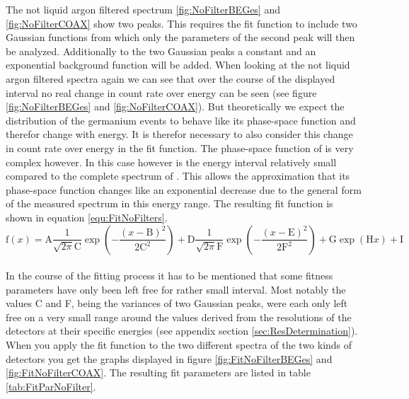\documentclass[encoding=utf8,british]{tumphthesis}
\begin{document}
The not liquid argon filtered spectrum \ref{fig:NoFilterBEGes} and \ref{fig:NoFilterCOAX} show two peaks.
This requires the fit function to include two Gaussian functions from which only the parameters of the second peak will then be analyzed.
Additionally to the two Gaussian peaks a constant and an exponential background function will be added.
When looking at the not liquid argon filtered spectra again we can see that over the course of the displayed interval no real change in count rate over energy can be seen (see figure \ref{fig:NoFilterBEGes} and \ref{fig:NoFilterCOAX}).
But theoretically we expect the distribution of the germanium events to behave like its phase-space function and therefor change with energy.
It is therefor necessary to also consider this change in count rate over energy in the fit function.
The phase-space function of  is very complex however.
In this case however is the energy interval relatively small compared to the complete spectrum of .
This allows the approximation that its phase-space function changes like an exponential decrease due to the general form of the measured spectrum in this energy range.
The resulting fit function is shown in equation \ref{equ:FitNoFilters}.
\\

\begin{equation}
\mathrm{f}(x) = \mathrm{A}\frac{1}{\sqrt{2\pi}\mathrm{C}}\exp\left(-\frac{(x-\mathrm{B})^2}{2\mathrm{C}^2}\right) + \mathrm{D}\frac{1}{\sqrt{2\pi}\mathrm{F}}\exp\left(-\frac{(x-\mathrm{E})^2}{2\mathrm{F}^2}\right) + \mathrm{G}\exp\left(\mathrm{H}x\right) + \mathrm{I}
\label{equ:FitNoFilters}
\end{equation}
\\

In the course of the fitting process it has to be mentioned that some fitness parameters have only been left free for rather small interval.
Most notably the values C and F, being the variances of two Gaussian peaks, were each only left free on a very small range around the values derived from the resolutions of the detectors at their specific energies (see appendix section \ref{sec:ResDetermination}).
When you apply the fit function to the two different spectra of the two kinds of detectors you get the graphs displayed in figure \ref{fig:FitNoFilterBEGes} and \ref{fig:FitNoFilterCOAX}.
The resulting fit parameters are listed in table \ref{tab:FitParNoFilter}. 
\\
\end{document}
